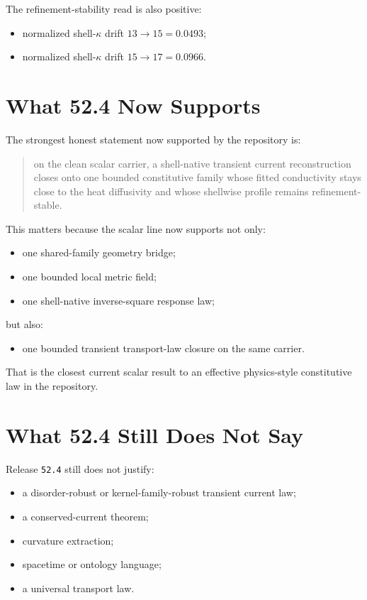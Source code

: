 \documentclass[11pt]{article}
\begin{document}
The refinement-stability read is also positive:
\begin{itemize}
\item normalized shell-\(\kappa\) drift \(13 \to 15 = 0.0493\);
\item normalized shell-\(\kappa\) drift \(15 \to 17 = 0.0966\).
\end{itemize}

\section{What 52.4 Now Supports}

The strongest honest statement now supported by the repository is:

\begin{quote}
on the clean scalar carrier, a shell-native transient current reconstruction closes onto one bounded constitutive family whose fitted conductivity stays close to the heat diffusivity and whose shellwise profile remains refinement-stable.
\end{quote}

This matters because the scalar line now supports not only:
\begin{itemize}
\item one shared-family geometry bridge;
\item one bounded local metric field;
\item one shell-native inverse-square response law;
\end{itemize}
but also:
\begin{itemize}
\item one bounded transient transport-law closure on the same carrier.
\end{itemize}

That is the closest current scalar result to an effective physics-style constitutive law in the repository.

\section{What 52.4 Still Does Not Say}

Release \texttt{52.4} still does not justify:
\begin{itemize}
\item a disorder-robust or kernel-family-robust transient current law;
\item a conserved-current theorem;
\item curvature extraction;
\item spacetime or ontology language;
\item a universal transport law.
\end{itemize}
\end{document}
